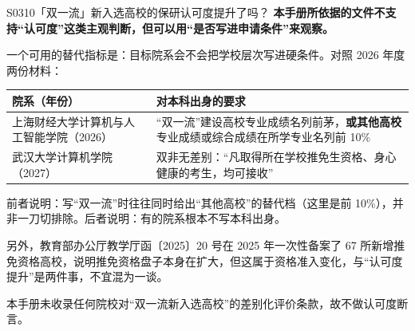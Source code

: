 \begin{qa}{S0310}{「双一流」新入选高校的保研认可度提升了吗？}
\textbf{本手册所依据的文件不支持“认可度”这类主观判断，但可以用“是否写进申请条件”来观察。}

一个可用的替代指标是：目标院系会不会把学校层次写进硬条件。对照 2026 年度两份材料：

\par\vspace{2pt}\nobreak\begin{center}\footnotesize
\begin{tabularx}{\textwidth}{>{\raggedright\arraybackslash}X>{\raggedright\arraybackslash}X}
\toprule
\textbf{院系（年份）} & \textbf{对本科出身的要求} \\ \midrule
上海财经大学计算机与人工智能学院（2026） & “双一流”建设高校专业成绩名列前茅，\textbf{或其他高校}专业成绩或综合成绩在所学专业名列前 10\% \\
武汉大学计算机学院（2027） & 双非无差别：“凡取得所在学校推免生资格、身心健康的考生，均可接收” \\
\bottomrule
\end{tabularx}
\end{center}\vspace{2pt}\par

前者说明：写“双一流”时往往同时给出“其他高校”的替代档（这里是前 10\%），并非一刀切排除。后者说明：有的院系根本不写本科出身。

另外，教育部办公厅教学厅函〔2025〕20 号在 2025 年一次性备案了 67 所新增推免资格高校，说明推免资格盘子本身在扩大，但这属于资格准入变化，与“认可度提升”是两件事，不宜混为一谈。

本手册未收录任何院校对“双一流新入选高校”的差别化评价条款，故不做认可度断言。
\end{qa}

